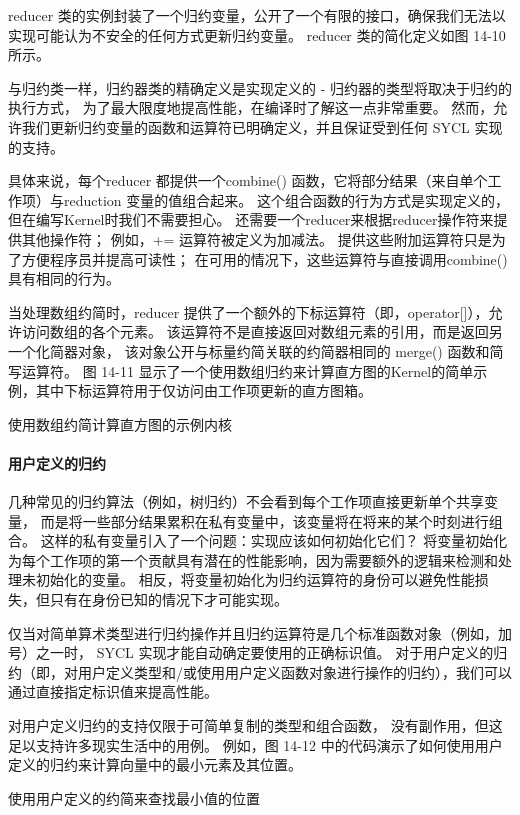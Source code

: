 reducer 类的实例封装了一个归约变量，公开了一个有限的接口，确保我们无法以实现可能认为不安全的任何方式更新归约变量。 
reducer 类的简化定义如图 14-10 所示。

与归约类一样，归约器类的精确定义是实现定义的 - 归约器的类型将取决于归约的执行方式，
为了最大限度地提高性能，在编译时了解这一点非常重要。 
然而，允许我们更新归约变量的函数和运算符已明确定义，并且保证受到任何 SYCL 实现的支持。

具体来说，每个reducer 都提供一个combine() 函数，它将部分结果（来自单个工作项）与reduction 变量的值组合起来。 
这个组合函数的行为方式是实现定义的，但在编写Kernel时我们不需要担心。 
还需要一个reducer来根据reducer操作符来提供其他操作符； 
例如，+= 运算符被定义为加减法。 提供这些附加运算符只是为了方便程序员并提高可读性； 
在可用的情况下，这些运算符与直接调用combine() 具有相同的行为。

当处理数组约简时，reducer 提供了一个额外的下标运算符（即，operator[]），允许访问数组的各个元素。 
该运算符不是直接返回对数组元素的引用，而是返回另一个化简器对象，
该对象公开与标量约简关联的约简器相同的 merge() 函数和简写运算符。 
图 14-11 显示了一个使用数组归约来计算直方图的Kernel的简单示例，其中下标运算符用于仅访问由工作项更新的直方图箱。

{\color{red} 使用数组约简计算直方图的示例内核}

\paragraph{用户定义的归约}

几种常见的归约算法（例如，树归约）不会看到每个工作项直接更新单个共享变量，
而是将一些部分结果累积在私有变量中，该变量将在将来的某个时刻进行组合。 
这样的私有变量引入了一个问题：实现应该如何初始化它们？ 
将变量初始化为每个工作项的第一个贡献具有潜在的性能影响，因为需要额外的逻辑来检测和处理未初始化的变量。 
相反，将变量初始化为归约运算符的身份可以避免性能损失，但只有在身份已知的情况下才可能实现。

仅当对简单算术类型进行归约操作并且归约运算符是几个标准函数对象（例如，加号）之一时，
SYCL 实现才能自动确定要使用的正确标识值。 
对于用户定义的归约（即，对用户定义类型和/或使用用户定义函数对象进行操作的归约），我们可以通过直接指定标识值来提高性能。

对用户定义归约的支持仅限于可简单复制的类型和组合函数，
没有副作用，但这足以支持许多现实生活中的用例。 
例如，图 14-12 中的代码演示了如何使用用户定义的归约来计算向量中的最小元素及其位置。

{\color{red} 使用用户定义的约简来查找最小值的位置}

